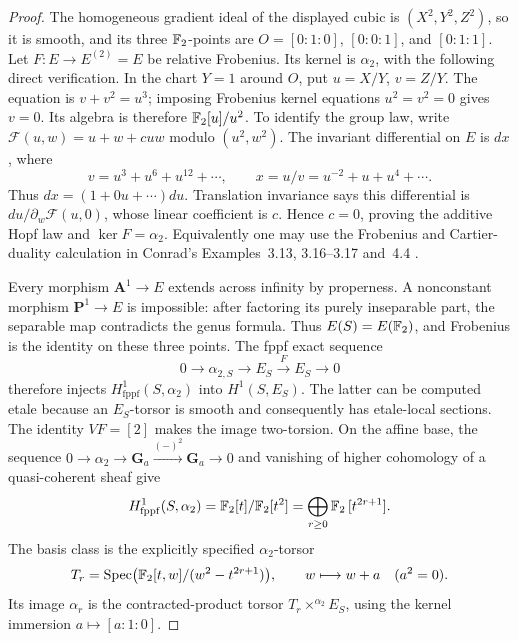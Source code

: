\begin{proof}
The homogeneous gradient ideal of the displayed cubic is
\((X^2,Y^2,Z^2)\), so it is smooth, and its three \(\mathbb F_2\)-points
are \(O=[0:1:0]\), \([0:0:1]\), and \([0:1:1]\).
Let \(F:E\to E^{(2)}=E\) be relative Frobenius.  Its kernel is
\(\alpha_2\), with the following direct verification.  In the
chart \(Y=1\) around \(O\), put \(u=X/Y\), \(v=Z/Y\).
The equation is \(v+v^2=u^3\); imposing Frobenius kernel equations
\(u^2=v^2=0\) gives \(v=0\).  Its algebra is therefore
\(\mathbb F_2[u]/u^2\).  To identify the group law, write
\(\mathcal F(u,w)=u+w+cuw\) modulo \((u^2,w^2)\).
The invariant differential on \(E\) is \(dx\), where
\[
 v=u^3+u^6+u^{12}+\cdots,
 \qquad x=u/v=u^{-2}+u+u^4+\cdots.
\]
Thus \(dx=(1+0u+\cdots)du\).  Translation invariance says this
differential is \(du/\partial_w\mathcal F(u,0)\), whose linear
coefficient is \(c\).  Hence \(c=0\), proving the additive
Hopf law and \(\ker F=\alpha_2\).  Equivalently one may use
the Frobenius and Cartier-duality calculation in
Conrad's Examples~3.13, 3.16--3.17 and~4.4
\cite{BConrad2006}.

Every morphism \(\mathbf A^1\to E\) extends across infinity
by properness.  A nonconstant morphism \(\mathbf P^1\to E\)
is impossible: after factoring its purely inseparable part, the
separable map contradicts the genus formula.  Thus
\(E(S)=E(\mathbb F_2)\), and Frobenius is the identity on these three
points.  The fppf exact sequence
\[
 0\longrightarrow\alpha_{2,S}\longrightarrow E_S
   \xrightarrow{F}E_S\longrightarrow0
\]
therefore injects \(H^1_{\mathrm{fppf}}(S,\alpha_2)\)
into \(H^1(S,E_S)\).  The latter can be computed etale because
an \(E_S\)-torsor is smooth and consequently has etale-local
sections.  The identity \(VF=[2]\) makes the image two-torsion.
On the affine base, the sequence
\(0\to\alpha_2\to\mathbf G_a\xrightarrow{(-)^2}\mathbf G_a\to0\)
and vanishing of higher cohomology of a quasi-coherent sheaf give
\[
 H^1_{\mathrm{fppf}}(S,\alpha_2)
   =\mathbb F_2[t]/\mathbb F_2[t^2]
   =\bigoplus_{r\geq0}\mathbb F_2\,[t^{2r+1}].
\]
The basis class is the explicitly specified \(\alpha_2\)-torsor
\[
 T_r=\operatorname{Spec}\bigl(\mathbb F_2[t,w]/(w^2-t^{2r+1})\bigr),
 \qquad w\longmapsto w+a\quad(a^2=0).
\]
Its image \(\alpha_r\) is the contracted-product torsor
\(T_r\times^{\alpha_2}E_S\), using the kernel immersion
\(a\mapsto[a:1:0]\).


\end{proof}
